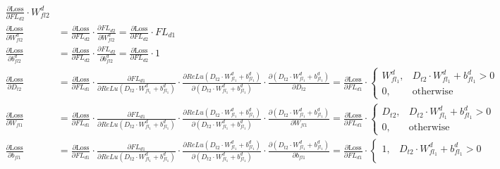 \documentclass[12pt,letterpaper]{article}
\begin{document}
\begin{align*}
\frac{\partial \text{Loss}}{\partial FL_{d2}}\cdot W^d_{fl2}\\
\frac{\partial \text{Loss}}{\partial W^d_{fl2}} &= %
\frac{\partial \text{Loss}}{\partial FL_{d2}} \cdot 
\frac{\partial FL_{d2}}{\partial W^d_{fl2}}=
\frac{\partial \text{Loss}}{\partial FL_{d2}}\cdot FL_{d1}\\
\frac{\partial \text{Loss}}{\partial b^d_{fl2}} &= %
\frac{\partial \text{Loss}}{\partial FL_{d2}} \cdot 
\frac{\partial FL_{d2}}{\partial b^d_{fl2}}=
\frac{\partial \text{Loss}}{\partial FL_{d2}}\cdot 1\\
\frac{\partial \text{Loss}}{\partial D_{t2}} &= %
\frac{\partial \text{Loss}}{\partial FL_{d1}} \cdot
\frac{\partial FL_{d1}}{\partial ReLu(D_{t2} \cdot W^d_{fl_1} + b^d_{fl_1})} \cdot
\frac{\partial ReLu(D_{t2} \cdot W^d_{fl_1} + b^d_{fl_1})}{\partial (D_{t2} \cdot W^d_{fl_1} + b^d_{fl_1})} \cdot
\frac{\partial (D_{t2} \cdot W^d_{fl_1} + b^d_{fl_1})}{\partial D_{t2}}=
\frac{\partial \text{Loss}}{\partial FL_{d1}} \cdot \begin{cases}
    W^d_{fl_1}, & D_{t2} \cdot W^d_{fl_1} + b^d_{fl_1} > 0 \\
    0, & \text{otherwise}
    \end{cases} 
    \\
\frac{\partial \text{Loss}}{\partial W_{fl1}} &= %
\frac{\partial \text{Loss}}{\partial FL_{d1}} \cdot
\frac{\partial FL_{d1}}{\partial ReLu(D_{t2} \cdot W^d_{fl_1} + b^d_{fl_1})} \cdot
\frac{\partial ReLu(D_{t2} \cdot W^d_{fl_1} + b^d_{fl_1})}{\partial (D_{t2} \cdot W^d_{fl_1} + b^d_{fl_1})} \cdot
\frac{\partial (D_{t2} \cdot W^d_{fl_1} + b^d_{fl_1})}{\partial W_{fl1}}=
\frac{\partial \text{Loss}}{\partial FL_{d1}} \cdot \begin{cases}
    D_{t2}, & D_{t2} \cdot W^d_{fl_1} + b^d_{fl_1} > 0 \\
    0, & \text{otherwise}
    \end{cases}\\
    \frac{\partial \text{Loss}}{\partial b_{fl1}} &= %
    \frac{\partial \text{Loss}}{\partial FL_{d1}} \cdot
    \frac{\partial FL_{d1}}{\partial ReLu(D_{t2} \cdot W^d_{fl_1} + b^d_{fl_1})} \cdot
    \frac{\partial ReLu(D_{t2} \cdot W^d_{fl_1} + b^d_{fl_1})}{\partial (D_{t2} \cdot W^d_{fl_1} + b^d_{fl_1})} \cdot
    \frac{\partial (D_{t2} \cdot W^d_{fl_1} + b^d_{fl_1})}{\partial b_{fl1}}=
    \frac{\partial \text{Loss}}{\partial FL_{d1}} \cdot \begin{cases}
        1, & D_{t2} \cdot W^d_{fl_1} + b^d_{fl_1} > 0 \\

\end{cases}
\end{align*}
\end{document}
